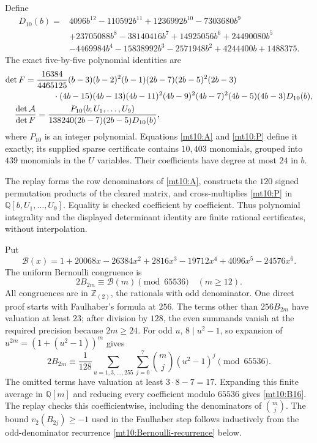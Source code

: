 \documentclass[11pt,a4paper]{article}
\numberwithin{equation}{section}
\theoremstyle{definition}
\theoremstyle{remark}
\begin{document}
Define
\begin{align*}
 D_{10}(b)={}&4096b^{12}-110592b^{11}+1236992b^{10}-7303680b^9\\
 &+23705088b^8-38140416b^7+14925056b^6+24490080b^5\\
 &-4469984b^4-15838992b^3-2571948b^2+4244400b+1488375.
\end{align*}
The exact five-by-five polynomial identities are
\begin{align}
 \det F={}&\frac{16384}{4465125}
 (b-3)(b-2)^2(b-1)(2b-7)(2b-5)^2(2b-3)\notag\\
 &\qquad\cdot(4b-15)(4b-13)(4b-11)^2(4b-9)^2(4b-7)^2
 (4b-5)(4b-3)D_{10}(b),\label{mt10:Fdet}\\
 \frac{\det\mathcal A}{\det F}
   &=\frac{P_{10}(b;U_1,\ldots,U_9)}{
        138240(2b-7)(2b-5)D_{10}(b)},\label{mt10:P}
\end{align}
where $P_{10}$ is an integer polynomial. Equations \eqref{mt10:A}
and \eqref{mt10:P} define it exactly; its supplied sparse certificate
contains $10{,}403$ monomials, grouped into $439$ monomials in the
$U$ variables. Their coefficients have degree at most $24$ in $b$.

The replay forms the row denominators of \eqref{mt10:A}, constructs
the $120$ signed permutation products of the cleared matrix, and
cross-multiplies \eqref{mt10:P} in
$\mathbb Q[b,U_1,\ldots,U_9]$. Equality is checked coefficient by
coefficient. Thus polynomial integrality and the displayed determinant
identity are finite rational certificates, without interpolation.

Put
\[
 \mathcal B(x)=1+20068x-26384x^2+2816x^3-19712x^4
                         +4096x^5-24576x^6.
\]
The uniform Bernoulli congruence is
\begin{equation}\label{mt10:B16}
           2B_{2m}\equiv\mathcal B(m)\pmod {65536}
                  \quad(m\ge12).
\end{equation}
All congruences are in $\mathbb Z_{(2)}$, the rationals with odd
denominator. One direct proof starts with Faulhaber's formula at
$256$. The terms other than $256B_{2m}$ have valuation at least
$23$; after division by $128$, the even summands vanish at the
required precision because $2m\ge24$. For odd $u$, $8\mid u^2-1$,
so expansion of $u^{2m}=(1+(u^2-1))^m$ gives
\[
 2B_{2m}\equiv\frac1{128}
       \sum_{u=1,3,\ldots,255}\sum_{j=0}^7
                    \binom mj(u^2-1)^j\pmod {65536}.
\]
The omitted terms have valuation at least $3\cdot8-7=17$.
Expanding this finite average in $\mathbb Q[m]$ and reducing every
coefficient modulo $65536$ gives \eqref{mt10:B16}. The replay
checks this coefficientwise, including the denominators of
$\binom mj$. The bound $v_2(B_{2j})\ge-1$ used in the Faulhaber
step follows inductively from the odd-denominator recurrence
\eqref{mt10:Bernoulli-recurrence} below.
\end{document}
